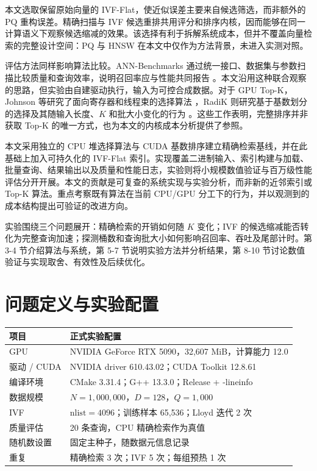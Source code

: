 \documentclass[UTF8,a4paper,zihao=5,fontset=none]{ctexart}
\begin{document}
本文选取保留原始向量的 IVF-Flat，使近似误差主要来自候选筛选，而非额外的PQ 重构误差。精确扫描与 IVF 候选重排共用评分和排序内核，因而能够在同一计算语义下观察候选缩减的效果。该选择有利于拆解系统成本，但并不覆盖向量检索的完整设计空间：PQ 与 HNSW 在本文中仅作为方法背景，未进入实测对照。


评估方法同样影响算法比较。ANN-Benchmarks 通过统一接口、数据集与参数扫描比较质量和查询效率，说明召回率应与性能共同报告 \cite{r5}。本文沿用这种联合观察的思路，但实验由自建驱动执行，输入为可控合成数据。对于 GPU Top-K，Johnson 等研究了面向寄存器和线程束的选择算法 \cite{r1}，RadiK 则研究基于基数划分的选择及其随输入长度、$K$ 和批大小变化的行为 \cite{r6}。这些工作表明，完整排序并非获取 Top-K 的唯一方式，也为本文的内核成本分析提供了参照。


本文采用独立的 CPU 堆选择算法与 CUDA 基数排序建立精确检索基线，并在此基础上加入可持久化的 IVF-Flat 索引。实现覆盖二进制输入、索引构建与加载、批量查询、结果输出以及质量和性能日志，实验则将小规模数值验证与百万级性能评估分开开展。本文的贡献是可复查的系统实现与实验分析，而非新的近邻索引或Top-K 算法。重点考察既有算法在当前 CPU/GPU 分工下的行为，并以观测到的成本结构提出可验证的改进方向。


实验围绕三个问题展开：精确检索的开销如何随 $K$ 变化；IVF 的候选缩减能否转化为完整查询加速；探测桶数和查询批大小如何影响召回率、吞吐及尾部计时。第 3-4 节介绍算法与系统，第 5-7 节说明实验方法并分析结果，第 8-10 节讨论数值验证与实现取舍、有效性及后续优化。


\section{问题定义与实验配置}

\par\medskip\noindent\begin{minipage}{\linewidth}
\small
{}\label{tab:1}
\begin{tabular}{@{}P{41.389mm}P{117.799mm}@{}}
\toprule
\textbf{项目} & \textbf{正式实验配置} \\
\midrule
GPU & NVIDIA GeForce RTX 5090，32,607 MiB，计算能力 12.0 \\
驱动 / CUDA & NVIDIA driver 610.43.02；CUDA Toolkit 12.8.61 \\
编译环境 & CMake 3.31.4；G++ 13.3.0；Release + {\small\ttfamily -\allowbreak{}lineinfo} \\
数据规模 & $N=1{,}000{,}000$，$D=128$，$Q=1{,}000$ \\
IVF & $\mathrm{nlist}=4096$；训练样本 65,536；Lloyd 迭代 2 次 \\
质量评估 & 20 条查询，CPU 精确检索作为真值 \\
随机数设置 & 固定主种子，随数据元信息记录 \\
重复 & 精确检索 3 次；IVF 5 次；每组预热 1 次 \\
\bottomrule
\end{tabular}
\end{minipage}\par\medskip
\end{document}
